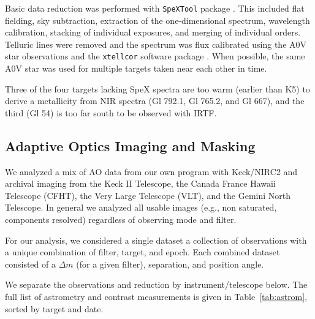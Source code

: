 \documentclass[twocolumn]{aastex62}
\begin{document}
Basic data reduction was performed with {\tt SpeXTool} package \citep{Cushing2004}. This included flat fielding, sky subtraction, extraction of the one-dimensional spectrum, wavelength calibration, stacking of individual exposures, and merging of individual orders. Telluric lines were removed and the spectrum was flux calibrated using the A0V star observations and the {\tt xtellcor} software package \citep{Vacca2003}. When possible, the same A0V star was used for multiple targets taken near each other in time. 

Three of the four targets lacking SpeX spectra are too warm (earlier than K5) to derive a metallicity from NIR spectra (Gl 792.1, Gl 765.2, and Gl 667), and the third (Gl 54) is too far south to be observed with IRTF. 

\subsection{Adaptive Optics Imaging and Masking}\label{sec:ao}

We analyzed a mix of AO data from our own program with Keck/NIRC2 and archival imaging from the Keck II Telescope, the Canada France Hawaii Telescope (CFHT), the Very Large Telescope (VLT), and the Gemini North Telescope. In general we analyzed all usable images (e.g., non saturated, components resolved) regardless of observing mode and filter. 

For our analysis, we considered a single dataset a collection of observations with a unique combination of filter, target, and epoch. Each combined dataset consisted of a $\Delta m$ (for a given filter), separation, and position angle. 

We separate the observations and reduction by instrument/telescope below. The full list of astrometry and contrast measurements is given in Table~\ref{tab:astrom}, sorted by target and date. 

\end{document}
